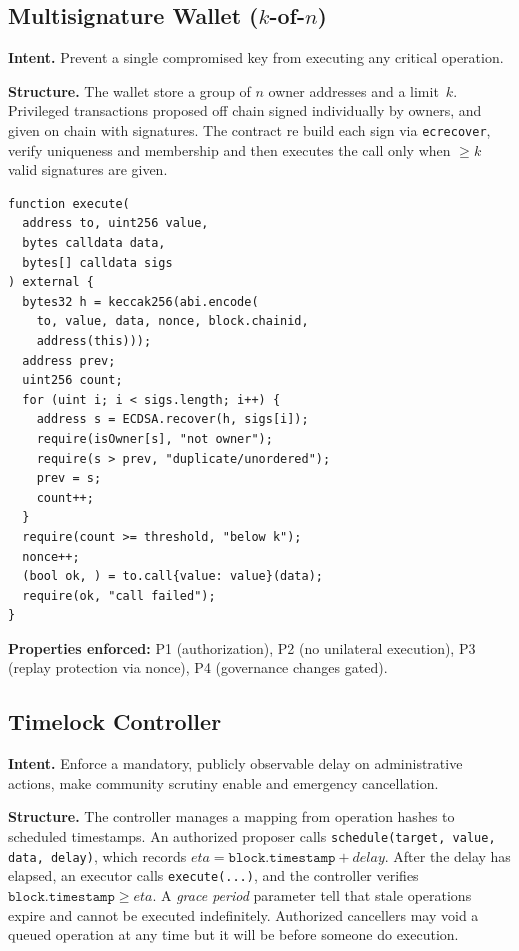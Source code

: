 \documentclass[conference]{IEEEtran}
\begin{document}
\subsection{Multisignature Wallet ($k$-of-$n$)}
\label{sec:multisig}

\textbf{Intent.}  Prevent a single compromised key from executing any
critical operation.

\textbf{Structure.}  The wallet store a group of $n$ owner addresses
and a limit~$k$.  Privileged transactions proposed off chain 
signed individually by owners, and given on chain with
signatures.  The contract re build each sign via
\texttt{ecrecover}, verify uniqueness and membership and  then executes
the call only when $\geq k$ valid signatures are given.

\begin{lstlisting}[float=!t, caption={Simplified multisig execution
  (gas-optimized: off-chain signing, on-chain verification).},
  label=lst:multisig]
function execute(
  address to, uint256 value,
  bytes calldata data,
  bytes[] calldata sigs
) external {
  bytes32 h = keccak256(abi.encode(
    to, value, data, nonce, block.chainid,
    address(this)));
  address prev;
  uint256 count;
  for (uint i; i < sigs.length; i++) {
    address s = ECDSA.recover(h, sigs[i]);
    require(isOwner[s], "not owner");
    require(s > prev, "duplicate/unordered");
    prev = s;
    count++;
  }
  require(count >= threshold, "below k");
  nonce++;
  (bool ok, ) = to.call{value: value}(data);
  require(ok, "call failed");
}
\end{lstlisting}

\textbf{Properties enforced:} P1 (authorization), P2 (no unilateral
execution), P3 (replay protection via nonce), P4 (governance
changes gated).

\subsection{Timelock Controller}
\label{sec:timelock}

\textbf{Intent.}  Enforce a mandatory, publicly observable delay on
administrative actions, make community scrutiny enable and emergency
cancellation.

\textbf{Structure.}  The controller manages a mapping from operation
hashes to scheduled timestamps.  An authorized proposer calls
\texttt{schedule(target, value, data, delay)}, which records
$\mathit{eta} = \texttt{block.timestamp} + \mathit{delay}$.  After
the delay has elapsed, an executor calls \texttt{execute(...)}, and
the controller verifies $\texttt{block.timestamp} \geq \mathit{eta}$.
A \emph{grace period} parameter tell that stale operations expire
and cannot be executed indefinitely.  Authorized cancellers may void a
queued operation at any time but it will be before someone do execution.
\end{document}
